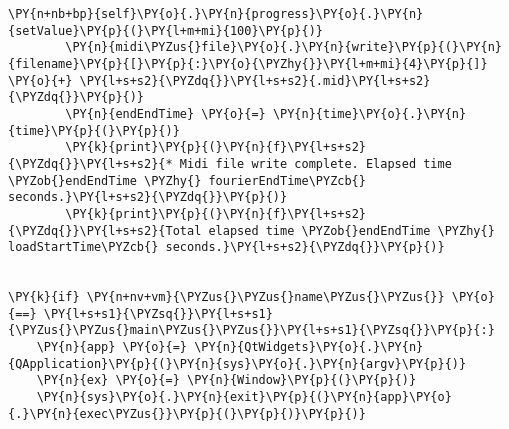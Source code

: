 \begin{Verbatim}[commandchars=\\\{\}]
        \PY{n+nb+bp}{self}\PY{o}{.}\PY{n}{progress}\PY{o}{.}\PY{n}{setValue}\PY{p}{(}\PY{l+m+mi}{100}\PY{p}{)}
        \PY{n}{midi\PYZus{}file}\PY{o}{.}\PY{n}{write}\PY{p}{(}\PY{n}{filename}\PY{p}{[}\PY{p}{:}\PY{o}{\PYZhy{}}\PY{l+m+mi}{4}\PY{p}{]} \PY{o}{+} \PY{l+s+s2}{\PYZdq{}}\PY{l+s+s2}{.mid}\PY{l+s+s2}{\PYZdq{}}\PY{p}{)}
        \PY{n}{endEndTime} \PY{o}{=} \PY{n}{time}\PY{o}{.}\PY{n}{time}\PY{p}{(}\PY{p}{)}
        \PY{k}{print}\PY{p}{(}\PY{n}{f}\PY{l+s+s2}{\PYZdq{}}\PY{l+s+s2}{* Midi file write complete. Elapsed time \PYZob{}endEndTime \PYZhy{} fourierEndTime\PYZcb{} seconds.}\PY{l+s+s2}{\PYZdq{}}\PY{p}{)}
        \PY{k}{print}\PY{p}{(}\PY{n}{f}\PY{l+s+s2}{\PYZdq{}}\PY{l+s+s2}{Total elapsed time \PYZob{}endEndTime \PYZhy{} loadStartTime\PYZcb{} seconds.}\PY{l+s+s2}{\PYZdq{}}\PY{p}{)}
    
    
\PY{k}{if} \PY{n+nv+vm}{\PYZus{}\PYZus{}name\PYZus{}\PYZus{}} \PY{o}{==} \PY{l+s+s1}{\PYZsq{}}\PY{l+s+s1}{\PYZus{}\PYZus{}main\PYZus{}\PYZus{}}\PY{l+s+s1}{\PYZsq{}}\PY{p}{:}
    \PY{n}{app} \PY{o}{=} \PY{n}{QtWidgets}\PY{o}{.}\PY{n}{QApplication}\PY{p}{(}\PY{n}{sys}\PY{o}{.}\PY{n}{argv}\PY{p}{)}
    \PY{n}{ex} \PY{o}{=} \PY{n}{Window}\PY{p}{(}\PY{p}{)}
    \PY{n}{sys}\PY{o}{.}\PY{n}{exit}\PY{p}{(}\PY{n}{app}\PY{o}{.}\PY{n}{exec\PYZus{}}\PY{p}{(}\PY{p}{)}\PY{p}{)}
\end{Verbatim}
